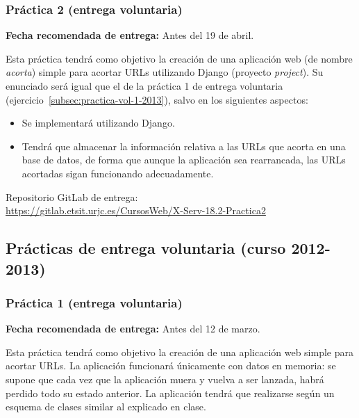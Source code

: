 \subsubsection{Práctica 2 (entrega voluntaria)}
\label{subsec:practica-vol-2-2013}

\textbf{Fecha recomendada de entrega:} Antes del 19 de abril.

Esta práctica tendrá como objetivo la creación de una aplicación web (de nombre \emph{acorta}) simple para acortar URLs utilizando Django (proyecto \emph{project}). Su enunciado será igual que el de la práctica 1 de entrega voluntaria (ejercicio~\ref{subsec:practica-vol-1-2013}), salvo en los siguientes aspectos:

\begin{itemize}
\item Se implementará utilizando Django.
\item Tendrá que almacenar la información relativa a las URLs que acorta en una base de datos, de forma que aunque la aplicación sea rearrancada, las URLs acortadas sigan funcionando adecuadamente.
\end{itemize}

Repositorio GitLab de entrega: \\
\url{https://gitlab.etsit.urjc.es/CursosWeb/X-Serv-18.2-Practica2}


\subsection{Prácticas de entrega voluntaria (curso 2012-2013)}

\subsubsection{Práctica 1 (entrega voluntaria)}
\label{subsec:practica-vol-1-2012}

\textbf{Fecha recomendada de entrega:} Antes del 12 de marzo.

Esta práctica tendrá como objetivo la creación de una aplicación web simple para acortar URLs. La aplicación funcionará únicamente con datos en memoria: se supone que cada vez que la aplicación muera y vuelva a ser lanzada, habrá perdido todo su estado anterior. La aplicación tendrá que realizarse según un esquema de clases similar al explicado en clase.

